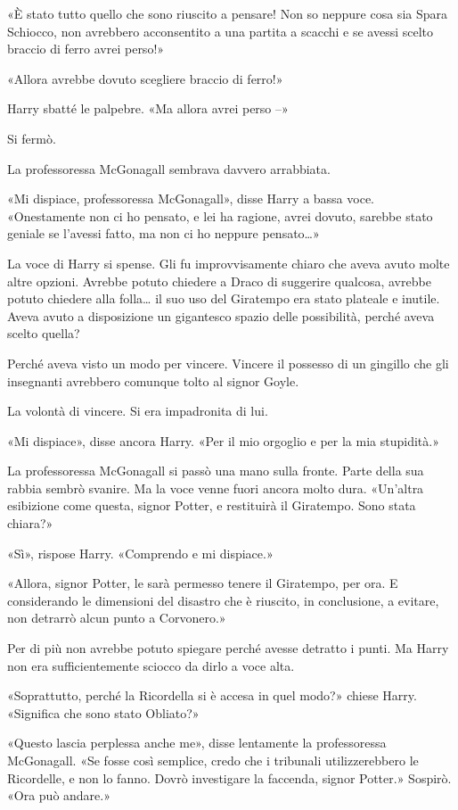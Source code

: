 «È stato tutto quello che sono riuscito a pensare! Non so neppure cosa sia Spara Schiocco, non avrebbero acconsentito a una partita a scacchi e se avessi scelto braccio di ferro avrei perso!»

«Allora avrebbe dovuto scegliere braccio di ferro!»

Harry sbatté le palpebre. «Ma allora avrei perso –»

Si fermò.

La professoressa McGonagall sembrava davvero arrabbiata.

«Mi dispiace, professoressa McGonagall», disse Harry a bassa voce. «Onestamente non ci ho pensato, e lei ha ragione, avrei dovuto, sarebbe stato geniale se l’avessi fatto, ma non ci ho neppure pensato…»

La voce di Harry si spense. Gli fu improvvisamente chiaro che aveva avuto molte altre opzioni. Avrebbe potuto chiedere a Draco di suggerire qualcosa, avrebbe potuto chiedere alla folla… il suo uso del Giratempo era stato plateale e inutile. Aveva avuto a disposizione un gigantesco spazio delle possibilità, perché aveva scelto quella?

Perché aveva visto un modo per vincere. Vincere il possesso di un gingillo che gli insegnanti avrebbero comunque tolto al signor Goyle.

La volontà di vincere. Si era impadronita di lui.

«Mi dispiace», disse ancora Harry. «Per il mio orgoglio e per la mia stupidità.»

La professoressa McGonagall si passò una mano sulla fronte. Parte della sua rabbia sembrò svanire. Ma la voce venne fuori ancora molto dura. «Un’altra esibizione come questa, signor Potter, e restituirà il Giratempo. Sono stata chiara?»

«Sì», rispose Harry. «Comprendo e mi dispiace.»

«Allora, signor Potter, le sarà permesso tenere il Giratempo, per ora. E considerando le dimensioni del disastro che è riuscito, in conclusione, a evitare, non detrarrò alcun punto a Corvonero.»

Per di più non avrebbe potuto spiegare perché avesse detratto i punti. Ma Harry non era sufficientemente sciocco da dirlo a voce alta.

«Soprattutto, perché la Ricordella si è accesa in quel modo?» chiese Harry. «Significa che sono stato Obliato?»

«Questo lascia perplessa anche me», disse lentamente la professoressa McGonagall. «Se fosse così semplice, credo che i tribunali utilizzerebbero le Ricordelle, e non lo fanno. Dovrò investigare la faccenda, signor Potter.» Sospirò. «Ora può andare.»


